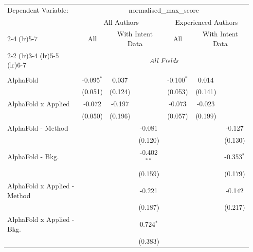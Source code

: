 \begingroup
\centering
\begin{tabular}{lcccccc}
   \tabularnewline \midrule \midrule
   Dependent Variable: & \multicolumn{6}{c}{normalised\_max\_score}\\
 & \multicolumn{3}{c}{All Authors} & \multicolumn{3}{c}{Experienced Authors} \\
\cmidrule(lr){2-4} \cmidrule(lr){5-7}
 & \multicolumn{1}{c}{All} & \multicolumn{2}{c}{With Intent Data} & \multicolumn{1}{c}{All} & \multicolumn{2}{c}{With Intent Data} \\
\cmidrule(lr){2-2} \cmidrule(lr){3-4} \cmidrule(lr){5-5} \cmidrule(lr){6-7}
 & \multicolumn{6}{c}{\textit{All Fields}} \\ \\
   AlphaFold                      & -0.095$^{*}$ & 0.037        &               & -0.100$^{*}$ & 0.014   &   \\   
                                  & (0.051)      & (0.124)      &               & (0.053)      & (0.141) &   \\   
   AlphaFold x Applied            & -0.072       & -0.197       &               & -0.073       & -0.023  &   \\   
                                  & (0.050)      & (0.196)      &               & (0.057)      & (0.199) &   \\   
   AlphaFold - Method             &              &              & -0.081        &              &         & -0.127\\   
                                  &              &              & (0.120)       &              &         & (0.130)\\   
   AlphaFold - Bkg.               &              &              & -0.402$^{**}$ &              &         & -0.353$^{*}$\\   
                                  &              &              & (0.159)       &              &         & (0.179)\\   
   AlphaFold x Applied - Method   &              &              & -0.221        &              &         & -0.142\\   
                                  &              &              & (0.187)       &              &         & (0.217)\\   
   AlphaFold x Applied - Bkg.     &              &              & 0.724$^{*}$   &              &         &   \\   
                                  &              &              & (0.383)       &              &         &   \\   

\end{tabular}
